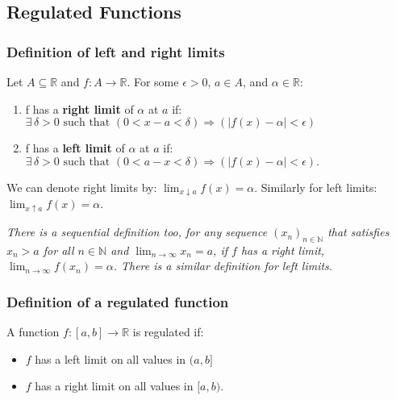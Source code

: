 \documentclass[a4paper, 12pt, twoside]{article}
\begin{document}
\newpage

\subsection{Regulated Functions}

\subsubsection{Definition of left and right limits}

Let $A \subseteq \mathbb{R}$ and $f:A\to\mathbb{R}$. For some $\epsilon > 0$,
$a \in A$, and  $\alpha \in \mathbb{R}$:

\begin{enumerate}
      \item f has a \textbf{right limit} of $\alpha$ at $a$ if: \\
            $\exists\,\delta > 0 \text{ such that } (0 < x - a < \delta)
                  \Rightarrow (|f(x) - \alpha| < \epsilon)$
      \item f has a \textbf{left limit} of $\alpha$ at $a$ if: \\
            $\exists\,\delta > 0 \text{ such that } (0 < a - x < \delta)
                  \Rightarrow (|f(x) - \alpha| < \epsilon).$
\end{enumerate}

We can denote right limits by: $\lim_{x\downarrow a}f(x) = \alpha$.
Similarly for left limits: $\lim_{x\uparrow a}f(x) = \alpha$.

\vspace{\baselineskip}

\textit{There is a sequential definition too, for any sequence
      $(x_n)_{n \in \mathbb{N}}$ that satisfies $x_n > a$ for all $n \in \mathbb{N}$
      and $\lim_{n\to\infty} x_n = a$, if $f$ has a right limit,
      $\lim_{n\to\infty}f(x_n) = \alpha$. There is a similar definition for left
      limits.}

\subsubsection{Definition of a regulated function}

A function $f:[a,b]\to\mathbb{R}$ is regulated if:

\begin{itemize}
      \item $f$ has a left limit on all values in $(a, b]$
      \item $f$ has a right limit on all values in $[a, b)$.
\end{itemize}
\end{document}
